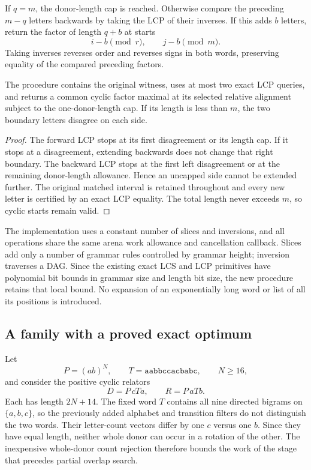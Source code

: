 If $q=m$, the donor-length cap is reached. Otherwise compare the preceding
$m-q$ letters backwards by taking the LCP of their inverses. If this adds
$b$ letters, return the factor of length $q+b$ at starts
\[
 i-b\pmod r,\qquad j-b\pmod m.
\]
Taking inverses reverses order and reverses signs in both words, preserving
equality of the compared preceding factors.

\begin{lemma}
The procedure contains the original witness, uses at most two exact LCP
queries, and returns a common cyclic factor maximal at its selected relative
alignment subject to the one-donor-length cap. If its length is less than
$m$, the two boundary letters disagree on each side.
\label{lem:extend}
\end{lemma}
\begin{proof}
The forward LCP stops at its first disagreement or its length cap. If it
stops at a disagreement, extending backwards does not change that right
boundary. The backward LCP stops at the first left disagreement or at the
remaining donor-length allowance. Hence an uncapped side cannot be extended
further. The original matched interval is retained throughout and every
new letter is certified by an exact LCP equality. The total length never
exceeds $m$, so cyclic starts remain valid.
\end{proof}

The implementation uses a constant number of slices and inversions, and all
operations share the same arena work allowance and cancellation callback.
Slices add only a number of grammar rules controlled by grammar height;
inversion traverses a DAG. Since the existing exact LCS and LCP primitives
have polynomial bit bounds in grammar size and length bit size, the new
procedure retains that local bound. No expansion of an exponentially long
word or list of all its positions is introduced.

\subsection{A family with a proved exact optimum}

Let
\[
 P=(ab)^N,\qquad T=\mathtt{aabbccacbabc},\qquad N\geq16,
\]
and consider the positive cyclic relators
\begin{equation}
 D=P\,cTa,\qquad R=P\,aTb.
 \label{eq:hard-overlap}
\end{equation}
Each has length $2N+14$. The fixed word $T$ contains all nine directed
bigrams on $\{a,b,c\}$, so the previously added alphabet and transition
filters do not distinguish the two words. Their letter-count vectors differ
by one $c$ versus one $b$. Since they have equal length, neither whole donor
can occur in a rotation of the other. The inexpensive whole-donor count
rejection therefore bounds the work of the stage that precedes partial
overlap search.

